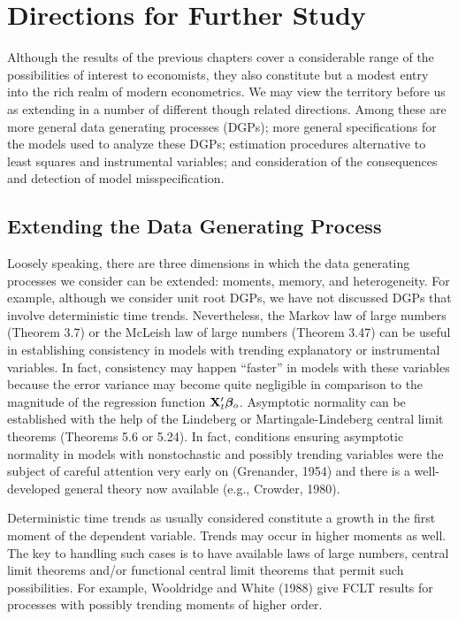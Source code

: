 \chapter{Directions for Further Study}\label{ch:further-study}

Although the results of the previous chapters cover a considerable range
of the possibilities of interest to economists, they also constitute but a
modest entry into the rich realm of modern econometrics. We may view
the territory before us as extending in a number of different though related directions. Among these are more general data generating processes
(DGPs); more general specifications for the models used to analyze these
DGPs; estimation procedures alternative to least squares and instrumental
variables; and consideration of the consequences and detection of model
misspecification.

\section{Extending the Data Generating Process}\label{sec:extending-dgp}

Loosely speaking, there are three dimensions in which the data generating
processes we consider can be extended: moments, memory, and heterogeneity. For example, although we consider unit root DGPs, we have not
discussed DGPs that involve deterministic time trends. Nevertheless, the
Markov law of large numbers (Theorem 3.7) or the McLeish law of large
numbers (Theorem 3.47) can be useful in establishing consistency in models with trending explanatory or instrumental variables. In fact, consistency
may happen ``faster'' in models with these variables because the error variance may become quite negligible in comparison to the magnitude of the
regression function $\mathbf{X}_t'\boldsymbol{\beta}_o$. Asymptotic normality can be established with
the help of the Lindeberg or Martingale-Lindeberg central limit theorems
(Theorems 5.6 or 5.24). In fact, conditions ensuring asymptotic normality in models with nonstochastic and possibly trending variables were the
subject of careful attention very early on (Grenander, 1954) and there is a
well-developed general theory now available (e.g., Crowder, 1980).

Deterministic time trends as usually considered constitute a growth in
the first moment of the dependent variable. Trends may occur in higher
moments as well. The key to handling such cases is to have available laws
of large numbers, central limit theorems and/or functional central limit theorems that permit such possibilities. For example, Wooldridge and White
(1988) give FCLT results for processes with possibly trending moments of
higher order.

